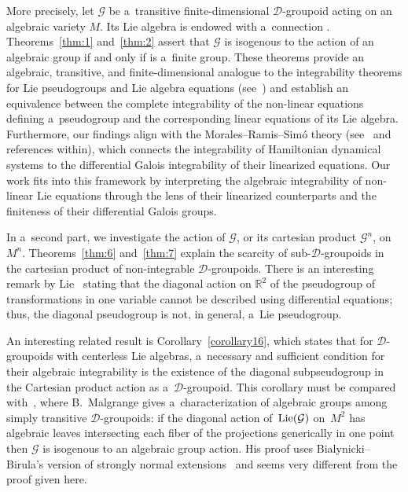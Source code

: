 \documentclass[pdftex]{sigma}
\numberwithin{equation}{section}
\theoremstyle{definition}
\begin{document}
More precisely, let $\mathcal G$ be a~transitive finite-dimensional $\mathcal D$-groupoid acting on an algebraic variety $M$. Its Lie algebra  is endowed with a~connection . Theorems~\ref{thm:1} and~\ref{thm:2} assert that $\mathcal G$ is isogenous to the action of an algebraic group if and only if  is a~finite group. These theorems provide an algebraic, transitive, and finite-dimensional analogue to the integrability theorems for Lie pseudogroups and Lie algebra equations (see~\cite{kumpera1972lie, munoz2000integrability,rodrigues1962first}) and establish an equivalence between the complete integrability of the non-linear equations defining a~pseudogroup and the corresponding linear equations of its Lie algebra. Furthermore, our findings align with the Morales--Ramis--Sim\'o theory (see~\cite{morales2007integrability} and references within), which connects the integrability of Hamiltonian dynamical systems to the differential Galois integrability of their linearized equations. Our work fits into this framework by interpreting the algebraic integrability of non-linear Lie equations through the lens of their linearized counterparts and the finiteness of their differential Galois groups.

In a~second part, we investigate the action of $\mathcal G$, or its cartesian product $\mathcal G^n$, on $M^n$.
Theorems~\ref{thm:6} and~\ref{thm:7} explain the scarcity of sub-$\mathcal D$-groupoids in the cartesian product of non-integrable $\mathcal D$-groupoids. There is an interesting remark by Lie~\cite[Chapter 25]{Lie1893} stating that the diagonal action on $\mathbb R^2$ of the pseudogroup of transformations in one variable cannot be {described using} differential equations; thus, the diagonal pseudogroup is not, in general, a~Lie pseudogroup.

An interesting related result is Corollary~\ref{corollary16},
 which states that for $\mathcal D$-groupoids with centerless Lie algebras, a~necessary and sufficient condition for their algebraic integrability is the existence of the diagonal subpseudogroup in the Cartesian product action as a~$\mathcal D$-groupoid. This corollary must be compared with~\cite[Theorem 2]{malgrange2012leon}, where B.~Malgrange gives a~characterization of algebraic groups among simply transitive $\mathcal D$-groupoids: if the diagonal action of~${\rm Lie(\mathcal G)}$ on~$M^2$ has algebraic leaves intersecting each fiber of the projections generically in one point then $\mathcal G$ is isogenous to an algebraic group action. His proof uses Bialynicki--Birula's version of strongly normal extensions~\cite{bialynicki1962galois} and seems very different from the proof given here.
\end{document}
